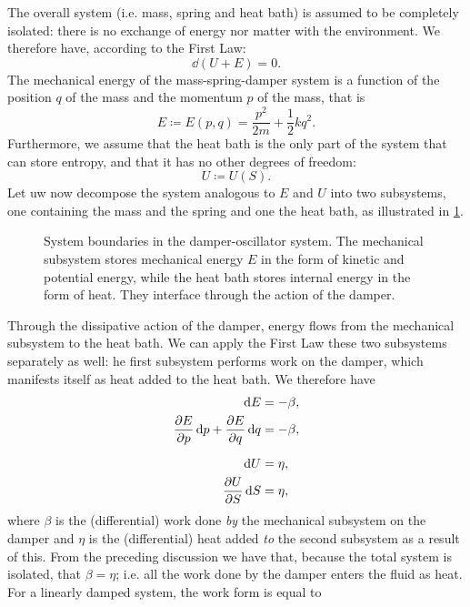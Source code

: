 The overall system (i.e. mass, spring and heat bath) is assumed to be completely isolated: there is no exchange of energy nor matter with the environment. We therefore have, according to the First Law:
\begin{equation}
    \dd{(U + E)} = 0. 
    \label{eq:dho_first_law}
\end{equation}
The mechanical energy of the mass-spring-damper system is a function of the position $q$ of the mass and the momentum $p$ of the mass, that is
\begin{equation}
    E \coloneq E(p, q) = \frac{p^2}{2m} + \frac{1}{2}kq^2. 
    \label{eq:dho_mech_energy}
\end{equation}
Furthermore, we assume that the heat bath is the only part of the system that can store entropy, and that it has no other degrees of freedom:
\begin{equation}
    U \coloneq U(S).  
    \label{eq:dho_int_energy}
\end{equation}
Let uw now decompose the system analogous to $E$ and $U$ into two subsystems, one containing the mass and the spring and one the heat bath, as illustrated in \cref{fig:oscillator_thermo}. 
\begin{figure}[ht!]
    \centering
    
    \caption{System boundaries in the damper-oscillator system. The mechanical subsystem stores mechanical energy $E$ in the form of kinetic and potential energy, while the heat bath stores internal energy in the form of heat. They interface through the action of the damper.}
    \label{fig:oscillator_thermo}
\end{figure}
Through the dissipative action of the damper, energy flows from the mechanical subsystem to the heat bath. We can apply the First Law these two subsystems separately as well: he first subsystem performs work on the damper, which manifests itself as heat added to the heat bath. We therefore have
\begin{equation}
    \begin{split}
        \dd{E} &= -\beta, \\
        \pdv{E}{p}\dd{p} + \pdv{E}{q}\dd{q} &= -\beta, \\[0.2cm]
        \dd{U} &= \eta, \\
        \pdv{U}{S}\dd{S} &= \eta, \\
    \end{split}
\end{equation}
where $\beta$ is the (differential) work done \emph{by} the mechanical subsystem on the damper and $\eta$ is the (differential) heat added \emph{to} the second subsystem as a result of this. From the preceding discussion we have that, because the total system is isolated, that $ \beta = \eta $; i.e. all the work done by the damper enters the fluid as heat. For a linearly damped system, the work form is equal to 

